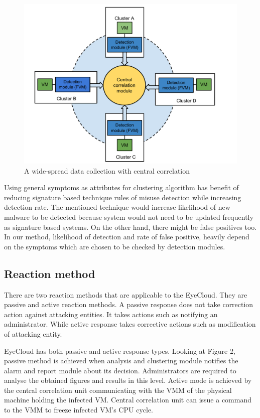 \documentclass[conference]{IEEEtran}
\begin{document}
\begin{figure}
\begin{center}
\includegraphics[scale=0.5]{pic111.pdf}
\caption{A wide-spread data collection with central correlation}
\label{Fig:111}
\end{center}
\end{figure}

Using general symptoms as attributes for clustering algorithm has benefit of reducing signature based technique rules of misuse detection while increasing detection rate. The mentioned technique would increase likelihood of new malware to be detected because system would not need to be updated frequently as signature based systems. On the other hand, there might be false positives too. In our method, likelihood of detection and rate of false positive, heavily depend on the symptoms which are chosen to be checked by detection modules.      

\subsection{Reaction method}
There are two reaction methods that are applicable to the EyeCloud. They are passive and active reaction methods. A passive response does not take correction action against attacking entities. It takes actions such as notifying an administrator. While active response takes corrective actions such as modification of attacking entity. 

EyeCloud has both passive and active response types. Looking at Figure 2, passive method is achieved when analysis and clustering module notifies the alarm and report module about its decision. Administrators are required to analyse the obtained figures and results in this level. Active mode is achieved by the central correlation unit communicating with the VMM of the physical machine holding the infected VM. Central correlation unit can issue a command to the VMM to freeze infected VM's CPU cycle.
\end{document}
